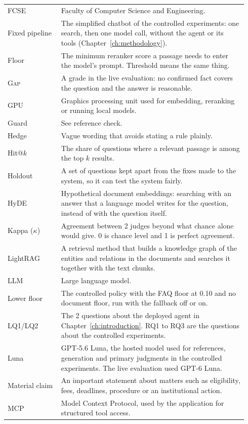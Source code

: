 \begin{longtable}{@{}>{\raggedright\arraybackslash}p{0.21\linewidth}>{\raggedright\arraybackslash}p{0.73\linewidth}@{}}
FCSE & Faculty of Computer Science and Engineering. \\
Fixed pipeline & The simplified chatbot of the controlled experiments: one search, then one model call, without the agent or its tools (Chapter~\ref{ch:methodology}). \\
Floor & The minimum reranker score a passage needs to enter the model's prompt. Threshold means the same thing. \\
\textsc{Gap} & A grade in the live evaluation: no confirmed fact covers the question and the answer is reasonable. \\
GPU & Graphics processing unit used for embedding, reranking or running local models. \\
Guard & See reference check. \\
Hedge & Vague wording that avoids stating a rule plainly. \\
Hit@$k$ & The share of questions where a relevant passage is among the top $k$ results. \\
Holdout & A set of questions kept apart from the fixes made to the system, so it can test the system fairly. \\
HyDE & Hypothetical document embeddings: searching with an answer that a language model writes for the question, instead of with the question itself. \\
Kappa ($\kappa$) & Agreement between 2 judges beyond what chance alone would give. 0 is chance level and 1 is perfect agreement. \\
LightRAG & A retrieval method that builds a knowledge graph of the entities and relations in the documents and searches it together with the text chunks. \\
LLM & Large language model. \\
Lower floor & The controlled policy with the FAQ floor at 0.10 and no document floor, run with the fallback off or on. \\
LQ1/LQ2 & The 2 questions about the deployed agent in Chapter~\ref{ch:introduction}. RQ1 to RQ3 are the questions about the controlled experiments. \\
Luna & GPT-5.6 Luna, the hosted model used for references, generation and primary judgments in the controlled experiments. The live evaluation used GPT-6 Luna. \\
Material claim & An important statement about matters such as eligibility, fees, deadlines, procedure or an institutional action. \\
MCP & Model Context Protocol, used by the application for structured tool access. \\

\end{longtable}
